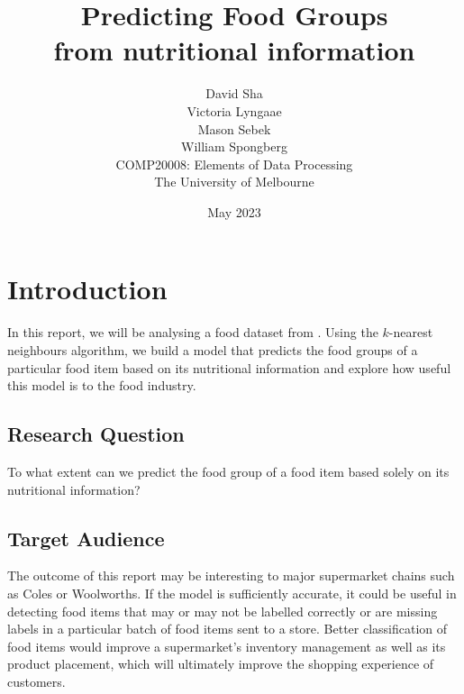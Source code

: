 \documentclass[11pt]{article}
\title{Predicting Food Groups \\ \vspace{0.5em} \large from nutritional information}
\author{
    David Sha\\
\AND
    Victoria Lyngaae\\
\AND
    Mason Sebek\\
\AND
    William Spongberg\\
\AND
\AND
	COMP20008: Elements of Data Processing\\
\AND
	The University of Melbourne\\
}
\date{May 2023}
\begin{document}
\maketitle

\newpage
\tableofcontents
\thispagestyle{empty}

\newpage
\setcounter{page}{1}
\section{Introduction}

In this report, we will be analysing a food dataset from \cite{FoodStandardsAustraliaNewZealand}. Using the $k$-nearest neighbours algorithm, we build a model that predicts the food groups of a particular food item based on its nutritional information and explore how useful this model is to the food industry.


\subsection{Research Question}
To what extent can we predict the food group of a food item based solely on its nutritional information?

\subsection{Target Audience}
The outcome of this report may be interesting to major supermarket chains such as Coles or Woolworths. If the model is sufficiently accurate, it could be useful in detecting food items that may or may not be labelled correctly or are missing labels in a particular batch of food items sent to a store. Better classification of food items would improve a supermarket's inventory management as well as its product placement, which will ultimately improve the shopping experience of customers.
\end{document}
